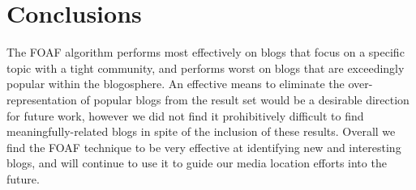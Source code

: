 \documentclass{sig-alternate}
\begin{document}
\section{Conclusions}


The FOAF algorithm performs most effectively on blogs that focus on a
specific topic with a tight community, and performs worst on blogs
that are exceedingly popular within the blogosphere.  An effective
means to eliminate the over-representation of popular blogs from the
result set would be a desirable direction for future work, however we
did not find it prohibitively difficult to find meaningfully-related
blogs in spite of the inclusion of these results. Overall we find the
FOAF technique to be very effective at identifying new and interesting
blogs, and will continue to use it to guide our media location efforts
into the future.




%


%
%

\end{document}
